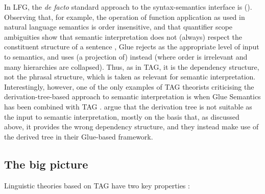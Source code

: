 \documentclass[output=paper,hidelinks]{langscibook}
\begin{document}
In LFG, the \textit{de facto} standard approach to the syntax-semantics interface
is  (). Observing that, for example, the
operation of function application as used in natural language semantics is order
insensitive, and that quantifier scope ambiguities show that semantic
interpretation does not (always) respect the constituent structure of a sentence
\citep[see][ch.~5]{Asudeh12}, Glue rejects \cstruc{} as the appropriate level of
input to semantics, and uses (a projection of) \fstruc{} instead (where order is
irrelevant and many \cstruc{} hierarchies are collapsed). Thus, as in TAG, it is
the dependency structure, not the phrasal structure, which is taken as relevant
for semantic interpretation.
Interestingly, however, one of the only examples of TAG theorists criticising
the derivation-tree-based approach to semantic interpretation is when Glue
Semantics has been combined with TAG \citep{frank:gluetag}.
\citeauthor{frank:gluetag} argue that the derivation tree is not
suitable as the input to semantic interpretation,  mostly on the basis that, as discussed above,
it provides the wrong dependency structure, and they instead make use of
the derived tree in their Glue-based framework.


\subsection{The big picture}\label{sec:TAG:tag-summary}

Linguistic theories based on TAG have two key properties
\citep[95f.]{joshi:tag-formal-hbk}:
\end{document}
